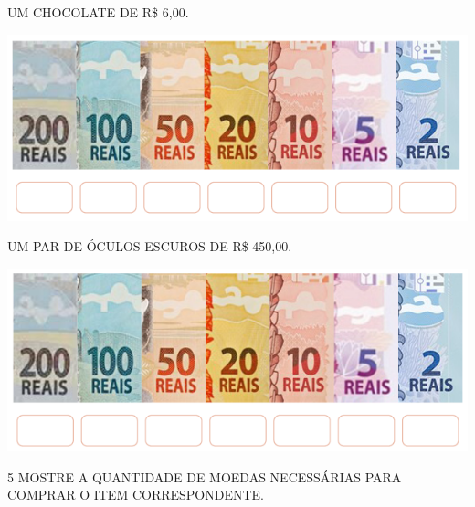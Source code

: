 \begin{escolha}

\item UM CHOCOLATE DE R\$ 6,00.

\includegraphics[width=.75\textwidth]{./media/SAEB_1ANO_MAT_FIGURA75.png}


\item UM PAR DE ÓCULOS ESCUROS DE R\$ 450,00.

\includegraphics[width=.75\textwidth]{./media/SAEB_1ANO_MAT_FIGURA76.png}

\end{escolha}


\pagebreak
\num{5} MOSTRE A QUANTIDADE DE MOEDAS NECESSÁRIAS PARA COMPRAR O ITEM CORRESPONDENTE.


